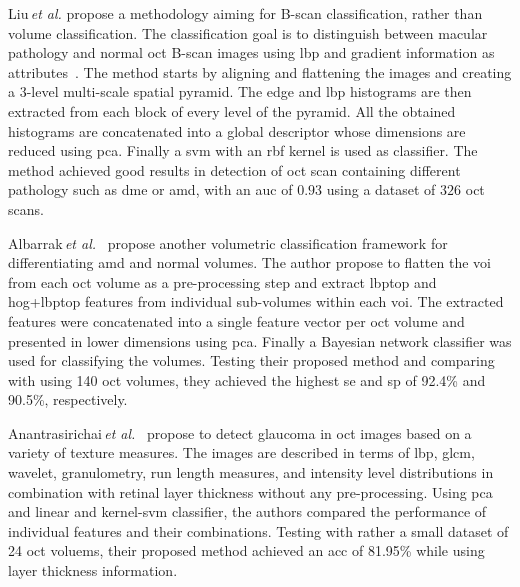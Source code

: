 %
Liu\,\textit{et al.} propose a methodology aiming for B-scan classification, rather than volume classification.
The classification goal is to distinguish between macular pathology and normal \gls{oct} B-scan images using \gls{lbp} and gradient information as attributes~\cite{Liu2011}.
%
The method starts by aligning and flattening the images and creating a $3$-level multi-scale spatial pyramid.
The edge and \gls{lbp} histograms are then extracted from each block of every level of the pyramid.
All the obtained histograms are concatenated into a global descriptor whose dimensions are reduced using \gls{pca}.
Finally a \gls{svm} with an \gls{rbf} kernel is used as classifier.
%
The method achieved good results in detection of \gls{oct} scan containing different pathology such as \gls{dme} or \gls{amd}, with an \gls{auc} of $0.93$ using a dataset of $326$ \gls{oct} scans.

Albarrak\,\textit{et al.}~\cite{albarrak2013age} propose another volumetric classification framework for differentiating \gls{amd} and normal volumes.
%
The author propose to flatten the \gls{voi} from each \gls{oct} volume as a pre-processing step and extract \gls{lbptop} and \gls{hog}+\gls{lbptop} features from individual sub-volumes within each \gls{voi}.
The extracted features were concatenated into a single feature vector per \gls{oct} volume and presented in lower dimensions using \gls{pca}.
Finally a Bayesian network classifier was used for classifying the volumes.
%
Testing their proposed method and comparing with \cite{Liu2011} using 140 \gls{oct} volumes, they achieved the highest \gls{se} and \gls{sp} of 92.4\% and 90.5\%, respectively.

Anantrasirichai\,\textit{et al.}~\cite{anantrasirichai2013svm} propose to detect glaucoma in \gls{oct} images based on a variety of texture measures.
%
The images are described in terms of \gls{lbp}, \gls{glcm}, wavelet, granulometry, run length measures, and intensity level distributions in combination with retinal layer thickness without any pre-processing.
Using \gls{pca} and linear and kernel-\gls{svm} classifier, the authors compared the performance of individual features and their combinations.
%
Testing with rather a small dataset of 24 \gls{oct} voluems, their proposed method achieved an \gls{acc} of 81.95\% while using layer thickness information.


